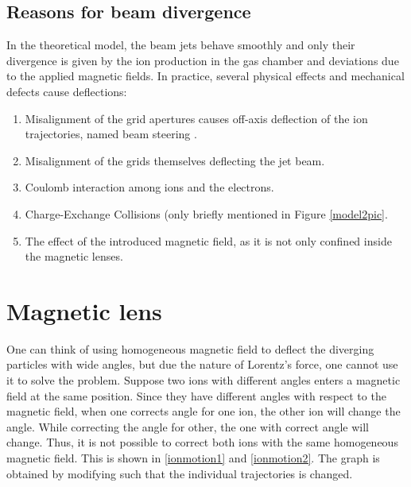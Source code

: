 \documentclass[twocolumn,12pt]{article}
\numberwithin{equation}{section} %
\numberwithin{equation}{section}
\begin{document}
\subsection{Reasons for beam divergence}
In the theoretical model, the beam jets behave smoothly and only their divergence is given by the ion production in the gas chamber and deviations due to the applied magnetic fields. In practice, several physical effects and mechanical defects cause deflections:
\begin{enumerate}
    \item Misalignment of the grid apertures causes off-axis deflection of the ion trajectories, named beam steering\cite{misalignment1} \cite{misalignment2}.
    \item Misalignment of the grids themselves deflecting the jet beam.
    \item Coulomb interaction among ions and the electrons.
    \item Charge-Exchange Collisions (only briefly mentioned in Figure \ref{model2pic}.
    \item The effect of the introduced magnetic field, as it is not only confined inside the magnetic lenses.
\end{enumerate}

\section{Magnetic lens}
\label{magneticlenssection}
One can think of using homogeneous magnetic field to deflect the diverging particles with wide angles, but due the nature of Lorentz's force, one cannot use it to solve the problem. Suppose two ions with different angles enters a magnetic field at the same position. Since they have different angles with respect to the magnetic field, when one corrects angle for one ion, the other ion will change the angle. While correcting the angle for other, the one with correct angle will change. Thus, it is not possible to correct both ions with the same homogeneous magnetic field. This is shown in \ref{ionmotion1} and \ref{ionmotion2}. The graph is obtained by modifying \cite{code} such that the individual trajectories is changed. 
\end{document}
